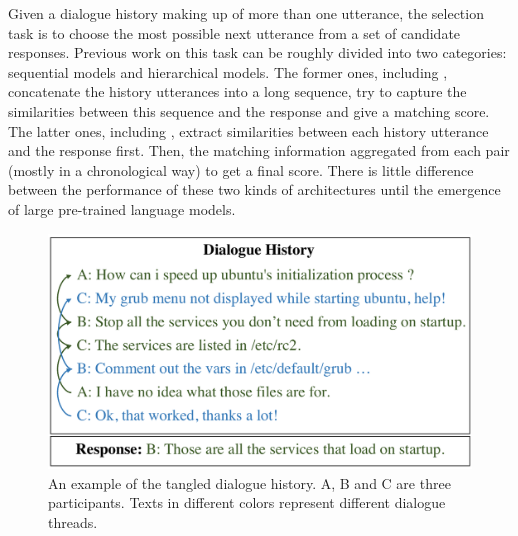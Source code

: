 Given a dialogue history making up of more than one utterance, the selection task is to choose the most possible next utterance from a set of candidate responses.  Previous work on this task can be roughly divided into two categories: sequential models and hierarchical models. The former ones, including \cite{LowePSP15,YanSW16,abs-1901-02609}, concatenate the history utterances into a long sequence, try to capture the similarities between this sequence and the response and give a matching score. The latter ones, including \cite{TaoWXHZY19,WangWC19,GuLL19}, extract similarities between each history utterance and the response first. Then, the matching information aggregated from each pair 
(mostly in a chronological way) to get a final score. 
There is little difference between the performance of these two kinds of 
architectures until the emergence of large pre-trained language models.
 
 \begin{figure}
 	\centering
 	\includegraphics[scale=0.43]{pic/example.pdf}
 	\caption{An example of the tangled dialogue history. A, B and C are three participants. Texts in different colors represent different dialogue threads.}
 	\label{fig:example}
 \end{figure}
 
